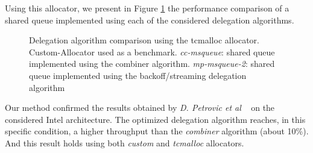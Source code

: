 \documentclass[10pt]{article}											%
\begin{document}
Using this allocator, we present in Figure \ref{delegationAlgorithmComparison.png} the performance comparison of a shared queue implemented using each of the considered delegation algorithms.\\

\begin{figure}[t]
\begin{center}
	\caption{Delegation algorithm comparison using the tcmalloc allocator. Custom-Allocator used as a benchmark.   \emph{cc-msqueue}:  shared queue implemented using the combiner algorithm.   \emph{mp-msqueue-2}: shared queue implemented using the backoff/streaming delegation algorithm}
	\label{delegationAlgorithmComparison.png}
\end{center}
\end{figure}

Our method confirmed the results obtained by \emph{D. Petrovic et al} ~\cite{delegationCS_roparsPetrovic} on the considered Intel architecture.   The optimized delegation algorithm reaches, in this specific condition, a higher throughput than the \emph{combiner} algorithm (about 10\%).  And this result holds using both \textit{custom} and \textit{tcmalloc} allocators.
\end{document}
